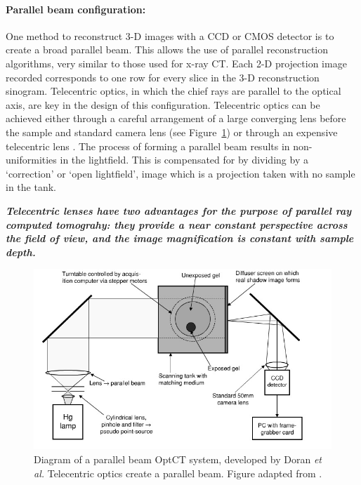\documentclass[12pt]{article}
\begin{document}
\paragraph{Parallel beam configuration:} One method to reconstruct 3-D images with a CCD or CMOS detector is to create a broad parallel beam. This allows the use of parallel reconstruction algorithms, very similar to those used for x-ray CT. Each 2-D projection image recorded corresponds to one row for every slice in the 3-D reconstruction sinogram. \cite{Doran:2008kh}
Telecentric optics, in which the chief rays are parallel to the optical axis, are key in the design of this configuration. \cite{Walls:2005ja} Telecentric optics can be achieved either through a careful arrangement  of  a large converging lens before the sample and standard camera lens  \cite{Doran:2001ee} (see Figure~\ref{fig:doran_ccd_setup}) or through an expensive telecentric lens \cite{Sakhalkar:2008exa}. The process of forming a parallel beam results in non-uniformities in the lightfield. This is compensated for by dividing by a `correction' or `open lightfield', image which is a projection taken with no sample in the tank. \cite{Doran:2001ee}

\textbf{\textit{Telecentric lenses have two advantages for the purpose of parallel ray computed tomograhy: they provide a near constant perspective across the field of view, and the image magnification is constant with sample depth.}} \cite{Oldham:2007ku}

\begin{figure}[H]
\centering
\includegraphics[scale=0.6]{Doran_2001_ccdsetup.jpg}
\caption{Diagram of a parallel beam  OptCT system, developed by Doran \textit{et al.} Telecentric optics create a parallel beam.  Figure adapted from \cite{Doran:2001ee}. }
\label{fig:doran_ccd_setup}
\end{figure}
\end{document}
